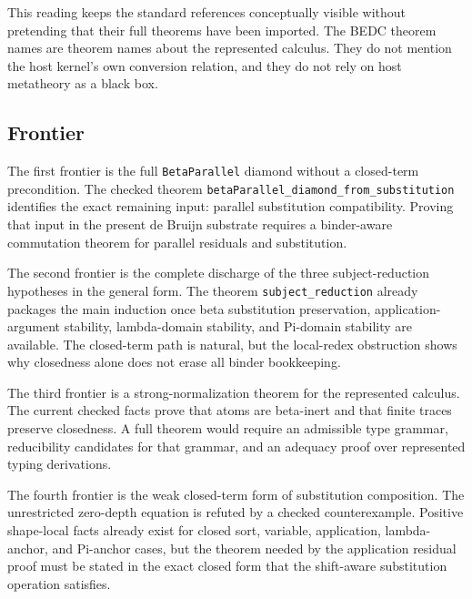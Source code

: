 This reading keeps the standard references conceptually visible without
pretending that their full theorems have been imported.  The BEDC theorem names
are theorem names about the represented calculus.  They do not mention the host
kernel's own conversion relation, and they do not rely on host metatheory as a
black box.

\subsection{Frontier}
\label{subsec:metatheory-frontier}

The first frontier is the full \texttt{BetaParallel} diamond without a
closed-term precondition.  The checked theorem
\texttt{betaParallel\_diamond\_from\_substitution} identifies the exact
remaining input: parallel substitution compatibility.  Proving that input in
the present de Bruijn substrate requires a binder-aware commutation theorem for
parallel residuals and substitution.

The second frontier is the complete discharge of the three subject-reduction
hypotheses in the general form.  The theorem
\texttt{subject\_reduction} already packages the main induction once beta
substitution preservation, application-argument stability, lambda-domain
stability, and Pi-domain stability are available.  The closed-term path is
natural, but the local-redex obstruction shows why closedness alone does not
erase all binder bookkeeping.

The third frontier is a strong-normalization theorem for the represented
calculus.  The current checked facts prove that atoms are beta-inert and that
finite traces preserve closedness.  A full theorem would require an admissible
type grammar, reducibility candidates for that grammar, and an adequacy proof
over represented typing derivations.

The fourth frontier is the weak closed-term form of substitution composition.
The unrestricted zero-depth equation is refuted by a checked counterexample.
Positive shape-local facts already exist for closed sort, variable,
application, lambda-anchor, and Pi-anchor cases, but the theorem needed by the
application residual proof must be stated in the exact closed form that the
shift-aware substitution operation satisfies.


